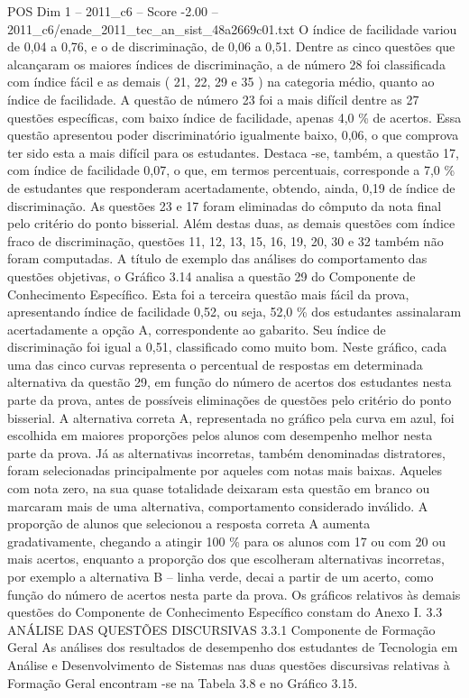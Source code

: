 \begin{textsample}{POS Dim 1 – 2011\_c6 – Score -2.00 – 2011\_c6/enade\_2011\_tec\_an\_sist\_48a2669c01.txt}
O índice de facilidade variou de 0,04 a 0,76, e o de discriminação, de 0,06 a 0,51.
Dentre as cinco questões que alcançaram os maiores índices de discriminação, a de número 28 foi classificada com índice fácil e as demais ( 21, 22, 29 e 35 ) na categoria médio, quanto ao índice de facilidade.
A questão de número 23 foi a mais difícil dentre as 27 questões específicas, com baixo índice de facilidade, apenas 4,0 \% de acertos.
Essa questão apresentou poder discriminatório igualmente baixo, 0,06, o que comprova ter sido esta a mais difícil para os estudantes.
Destaca -se, também, a questão 17, com índice de facilidade 0,07, o que, em termos percentuais, corresponde a 7,0 \% de estudantes que responderam acertadamente, obtendo, ainda, 0,19 de índice de discriminação.
As questões 23 e 17 foram eliminadas do cômputo da nota final pelo critério do ponto bisserial.
Além destas duas, as demais questões com índice fraco de discriminação, questões 11, 12, 13, 15, 16, 19, 20, 30 e 32 também não foram computadas.
A título de exemplo das análises do comportamento das questões objetivas, o Gráfico 3.14 analisa a questão 29 do Componente de Conhecimento Específico.
Esta foi a terceira questão mais fácil da prova, apresentando índice de facilidade 0,52, ou seja, 52,0 \% dos estudantes assinalaram acertadamente a opção A, correspondente ao gabarito.
Seu índice de discriminação foi igual a 0,51, classificado como muito bom.
Neste gráfico, cada uma das cinco curvas representa o percentual de respostas em determinada alternativa da questão 29, em função do número de acertos dos estudantes nesta parte da prova, antes de possíveis eliminações de questões pelo critério do ponto bisserial.
A alternativa correta A, representada no gráfico pela curva em azul, foi escolhida em maiores proporções pelos alunos com desempenho melhor nesta parte da prova.
Já as alternativas incorretas, também denominadas distratores, foram selecionadas principalmente por aqueles com notas mais baixas.
Aqueles com nota zero, na sua quase totalidade deixaram esta questão em branco ou marcaram mais de uma alternativa, comportamento considerado inválido.
A proporção de alunos que selecionou a resposta correta A aumenta gradativamente, chegando a atingir 100 \% para os alunos com 17 ou com 20 ou mais acertos, enquanto a proporção dos que escolheram alternativas incorretas, por exemplo a alternativa B – linha verde, decai a partir de um acerto, como função do número de acertos nesta parte da prova.
Os gráficos relativos às demais questões do Componente de Conhecimento Específico constam do Anexo I. 3.3 ANÁLISE DAS QUESTÕES DISCURSIVAS 3.3.1 Componente de Formação Geral As análises dos resultados de desempenho dos estudantes de Tecnologia em Análise e Desenvolvimento de Sistemas nas duas questões discursivas relativas à Formação Geral encontram -se na Tabela 3.8 e no Gráfico 3.15.

\end{textsample}

